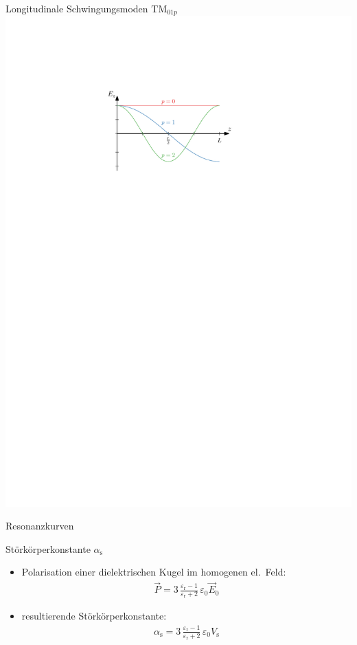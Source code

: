 \documentclass[12pt,xcolor=dvipsnames,professionalfonts]{beamer}
\begin{document}
\begin{frame}{Longitudinale Schwingungsmoden $\mathrm{TM}_{01p}$}
	\centering
	\includegraphics[scale=1.0]{./figures/longitudinale_periode.pdf}
\end{frame}

\begin{frame}{Resonanzkurven}
	\begin{small}
		\centering
		
	\end{small}
\end{frame}

\begin{frame}{Störkörperkonstante $\alpha_\mathrm{s}$}
	\begin{itemize}
		\item Polarisation einer dielektrischen Kugel im homogenen el.\ Feld:
		\begin{align*}
			  \vec{P} = 3 \, \frac{\varepsilon_\mathrm{r} - 1}{\varepsilon_\mathrm{r} + 2} \, \varepsilon_0 \vec{E}_0
		\end{align*}
		
		\item resultierende Störkörperkonstante:
		\begin{align*}
			\alpha_\mathrm{s} = 3 \, \frac{\varepsilon_\mathrm{r} - 1}{\varepsilon_\mathrm{r} + 2} \, \varepsilon_0 V_\mathrm{s}
		\end{align*}
	\end{itemize}
\end{frame}
\end{document}
